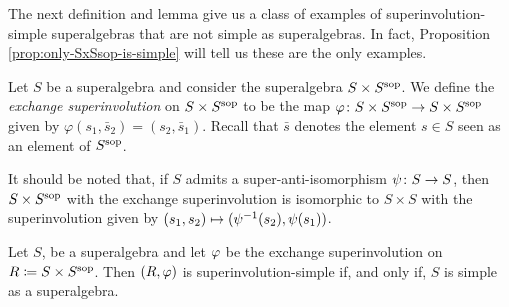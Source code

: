     


The next definition and lemma give us a class of examples of superinvolution-simple superalgebras that are not simple as superalgebras. 
In fact, Proposition \ref{prop:only-SxSsop-is-simple} will tell us these are the only examples. 

\begin{defi}\label{def:SxSsop}
    Let $S$ be a superalgebra and consider the superalgebra $S \times S^{\mathrm{sop}}$. 
    We define the \emph{exchange superinvolution} on $S \times S^{\mathrm{sop}}$ to be the map $\varphi\colon S \times S^{\mathrm{sop}} \to S \times S^{\mathrm{sop}}$ given by $\varphi (s_1, \bar s_2) = (s_2, \bar s_1)$. Recall that $\bar s$ denotes the element $s \in S$ seen as an element of $S^{\mathrm{sop}}$. 
\end{defi}

It should be noted that, if $S$ admits a super-anti-isomorphism $\psi\colon S \to S$, then $S\times S^{\mathrm{sop}}$ with the exchange superinvolution is isomorphic to $S\times S$ with the superinvolution given by $(s_1, s_2) \mapsto (\psi^{-1} (s_2), \psi (s_1))$.

\begin{lemma}\label{lemma:SxSsop-simple-iff-S-simple}
    Let $S$, be a superalgebra and let $\varphi$ be the exchange superinvolution on $R \coloneqq S \times S^{\mathrm{sop}}$. 
    Then $(R, \varphi)$ is superinvolution-simple if, and only if, $S$ is simple as a superalgebra. 
\end{lemma}

